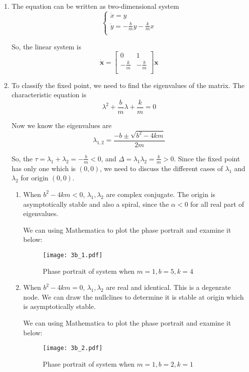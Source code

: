 \documentclass[12pt]{exam}
\begin{document}
\begin{enumerate}
	\item The equation can be written as two-dimensional system
	\[ \begin{cases}
		\dot{x} = y \\
		\dot{y} = -\frac{b}{m}y - \frac{k}{m}x \\
	\end{cases} \]

	So, the linear system is
	\[ \dot{\mathbf{x}} = \begin{bmatrix}
		0 & 1 \\
		-\frac{k}{m} & -\frac{b}{m} \\
	\end{bmatrix} \mathbf{x} \]

	\item To classify the fixed point, we need to find the eigenvalues of the matrix. The characteristic equation is 
	\[ \lambda^2 + \frac{b}{m}\lambda + \frac{k}{m} = 0 \]

	Now we know the eigenvalues are
	\[ \lambda_{1,2} = \frac{-b \pm \sqrt{b^2-4km}}{2m} \]

	So, the $\tau = \lambda_1 + \lambda_2 = -\frac{b}{m} < 0$, and $\Delta = \lambda_1 \lambda_2 = \frac{k}{m} > 0$. Since the fixed point has only one which is $(0, 0)$, we need to discuss the different cases of $\lambda_1$ and $\lambda_2$ for origin $(0,0)$.
	\newpage
	\begin{enumerate}
		\item When $b^2-4km < 0$, $\lambda_1, \lambda_2$ are complex conjugate. The origin is asymptotically stable and also a spiral, since the $\alpha < 0$ for all real part of eigenvalues.

			We can using Mathematica to plot the phase portrait and examine it below:
			\begin{figure}[H]
				\centering
				\texttt{[image: 3b\_1.pdf]}
				\caption{Phase portrait of system when $m=1, b=5, k=4$}
				\label{fig:3b_1}
			\end{figure}
		
		\item When $b^2-4km =0$, $\lambda_1, \lambda_2$ are real and identical. This is a degenrate node. We can draw the nullclines to determine it is stable at origin which is asymptotically stable.

			We can using Mathematica to plot the phase portrait and examine it below:
			\begin{figure}[H]
				\centering
				\texttt{[image: 3b\_2.pdf]}
				\caption{Phase portrait of system when $m=1, b=2, k=1$}
				\label{fig:3b_2}
			\end{figure}  
			

\end{enumerate}
\end{enumerate}
\end{document}
